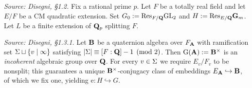 \begin{definition}
  \label{def:TotallyRealField}
  \textit{Source: Disegni, §1.2.}
  Fix a rational prime $p$.  Let $F$ be a totally real field and let
  $E/F$ be a CM quadratic extension.  Set
  $G_0 := \mathrm{Res}_{F/\mathbf{Q}}\mathrm{GL}_2$ and
  $H := \mathrm{Res}_{E/\mathbf{Q}}\mathbf{G}_m$.  Let $L$ be a finite extension of
  $\mathbf{Q}_p$ splitting $F$.
\end{definition}

\begin{definition}
  \label{def:QuaternionAlgebra}
  \textit{Source: Disegni, §1.3.1.}
  Let $\mathbf{B}$ be a quaternion algebra over $F_{\mathbf{A}}$ with ramification
  set $\Sigma \sqcup \{v \mid \infty\}$ satisfying
  $|\Sigma| \equiv [F:\mathbf{Q}] - 1 \pmod{2}$.  Then
  $\mathrm{G}(\mathbf{A}) := \mathbf{B}^\times$ is an \emph{incoherent} algebraic group over
  $\mathbf{Q}$.  For every $v \in \Sigma$ we require $E_v / F_v$ to be nonsplit;
  this guarantees a unique $\mathbf{B}^\times$-conjugacy class of embeddings
  $E_{\mathbf{A}} \hookrightarrow \mathbf{B}$, of which we fix one, yielding
  $\mathrm{e} \colon H \hookrightarrow G$.
\end{definition}

